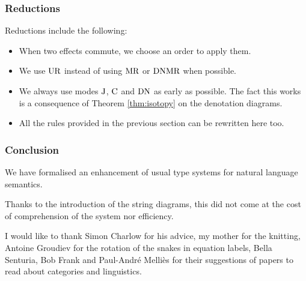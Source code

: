 \documentclass[math, english, info]{beamercours}
\begin{document}
\begin{frame}
	\frametitle{Reductions}
	Reductions include the following:
	\begin{itemize}
		\item When two effects commute, we choose an order to apply them.
		\item We use $\text{UR}$ instead of using $\text{MR}$ or $\text{DN} \text{MR}$ when
		      possible.
		\item We always use modes $\text{J}$, $\text{C}$ and $\text{DN}$ as early as
		      possible.
		      The fact this works is a consequence of Theorem \ref{thm:isotopy} on
		      the denotation diagrams.
		\item All the rules provided in the previous section can be rewritten here
		      too.
	\end{itemize}
\end{frame}

\begin{frame}
	\frametitle{Conclusion}
	We have formalised an enhancement of usual type systems for natural language
	semantics.

	\medskip

	Thanks to the introduction of the string diagrams, this did not come at the
	cost of comprehension of the system nor efficiency.

	\pause\medskip

	I would like to thank Simon Charlow for his advice, my mother for the
	knitting, Antoine Groudiev for the rotation of the snakes in equation labels,
	Bella Senturia, Bob Frank and Paul-André Melliès for their suggestions of
	papers to read about categories and linguistics.
\end{frame}

\questionsframe

\appendix

\end{document}
